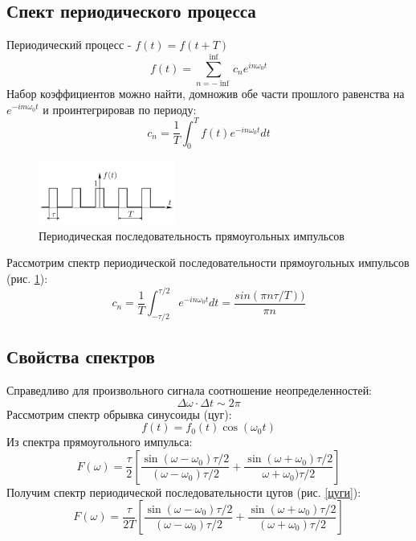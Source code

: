 \documentclass[a4paper,12pt]{article} %
\begin{document}
\subsection*{Спект периодического процесса}
Периодический процесс - $f(t)=f(t+T)$
\begin{equation}
f(t) = \sum_{n=-\inf}^{\inf} c_n e^{in\omega_0 t}
\end{equation}
Набор коэффициентов можно найти, домножив обе части прошлого равенства на $e^{-im\omega_0 t}$ и проинтегрировав по периоду:
\begin{equation}
c_n = \frac{1}{T}\int_0^T f(t)e^{-in\omega_0 t}dt
\end{equation}
\begin{figure}[h!]
\includegraphics[width=0.4\textwidth]{rect}
\caption{Периодическая последовательность прямоугольных импульсов} \label{rect}
\end{figure}
Рассмотрим спектр периодической последовательности прямоугольных импульсов (рис. \ref{rect}):
\begin{equation}
c_n = \frac{1}{T}\int_{-\tau / 2}^{\tau / 2} e^{-in\omega_0 t}dt = \dfrac{sin(\pi n \tau / T))}{\pi n}
\end{equation}

\subsection*{Свойства спектров}
Справедливо для произвольного сигнала соотношение неопределенностей:
\begin{equation}
\Delta \omega \cdot \Delta t \sim 2\pi
\end{equation}
Рассмотрим спектр обрывка синусоиды (цуг):
\begin{equation}
f(t) = f_0(t)\cos(\omega_0 t)
\end{equation}
Из спектра прямоугольного импульса:
\begin{equation}
F(\omega) = \dfrac{\tau}{2}\left[\dfrac{\sin(\omega-\omega_0)\tau /2}
{(\omega-\omega_0)\tau /2}
 + \dfrac{\sin(\omega+\omega_0)\tau /2}{\omega+\omega_0)\tau /2}\right]
\end{equation}
Получим спектр периодической последовательности цугов (рис. \ref{цуги}):
\begin{equation}
F(\omega) = \dfrac{\tau}{2T}\left[\dfrac{\sin(\omega-\omega_0)\tau /2}
{(\omega-\omega_0)\tau /2}
 + \dfrac{\sin(\omega+\omega_0)\tau /2}{(\omega+\omega_0)\tau /2}\right]
\end{equation}
\end{document}

